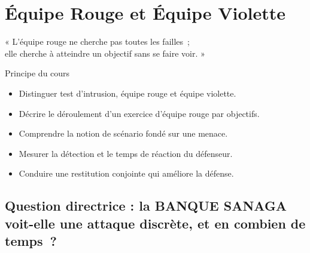 
\chapter{Équipe Rouge et Équipe Violette}
\label{chap:rouge}

\epigraph{%
    « L'équipe rouge ne cherche pas toutes les failles~;\\
    elle cherche à atteindre un objectif sans se faire voir. »%
}{Principe du cours}


\begin{boxobjectifs}
\begin{itemize}
    \item Distinguer test d'intrusion, équipe rouge et équipe violette.
    \item Décrire le déroulement d'un exercice d'équipe rouge par objectifs.
    \item Comprendre la notion de scénario fondé sur une menace.
    \item Mesurer la détection et le temps de réaction du défenseur.
    \item Conduire une restitution conjointe qui améliore la défense.
\end{itemize}
\end{boxobjectifs}

\bigskip

\section*{Question directrice : la BANQUE SANAGA voit-elle une attaque discrète, et en combien de temps~?}

